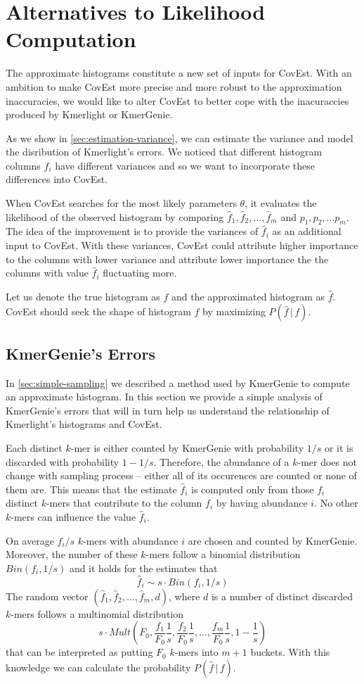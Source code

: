 \section{Alternatives to Likelihood Computation}
The approximate histograms constitute a new set of inputs for CovEst.
With an ambition to make CovEst more precise and more robust to the approximation inaccuracies,
we would like to alter CovEst to better cope with the inacuraccies produced by
Kmerlight or KmerGenie.

As we show in \ref{sec:estimation-variance}, we can estimate the variance and 
model the disribution of Kmerlight's errors. We noticed that different histogram columns $f_i$
have different variances and so we want to incorporate these differences into CovEst.

When CovEst searches for the most likely parameters $\theta$, it evaluates the likelihood
of the observed histogram by comparing $\hat f_1, \hat f_2, \dots, \hat f_m$ and 
$p_1, p_2, \dots p_m$. The idea of the improvement is to provide the variances of 
$\hat f_i$ as an additional input to CovEst. With these variances, CovEst could
attribute higher importance to the columns with lower variance and attribute
lower importance the the columns with value $\hat f_i$ fluctuating more.

Let us denote the true histogram as $f$ and the approximated histogram as $\hat f$.
CovEst should seek the shape of histogram $f$ by maximizing $P(\hat f \,|\, f)$. 

\subsection{KmerGenie's Errors}
\label{sec:kmergenie-errors}
In \ref{sec:simple-sampling} we described a method used by KmerGenie to compute 
an approximate histogram. In this section we provide a simple analysis of KmerGenie's
errors that will in turn help us understand the relationship of Kmerlight's histograms
and CovEst.

Each distinct $k$-mer is either counted by KmerGenie with probability $1/s$ or it is discarded 
with probability $1 - 1/s$. Therefore, the abundance of a $k$-mer does not change 
with sampling process -- either all of its occurences are counted or none of them are.
This means that the estimate $\hat f_i$ is computed only from those $f_i$ distinct $k$-mers 
that contribute to the column $f_i$ by having abundance $i$. No other $k$-mers can
influence the value $\hat f_i$.

On average $f_i / s$ $k$-mers with abundance $i$ are chosen and counted by KmerGenie.
Moreover, the number of these $k$-mers follow a binomial distribution $Bin(f_i, 1/s)$
and it holds for the estimates that
$$\hat f_i \sim s \cdot Bin(f_i, 1/s)$$
The random vector $(\hat f_1, \hat f_2, \dots, \hat f_m, d)$, where $d$ is a number
of distinct discarded $k$-mers follows a multinomial distribution 
$$s \cdot Mult\left(F_0, \frac{f_1}{F_0} \frac{1}{s}, \frac{f_2}{F_0} \frac{1}{s}, \dots, 
\frac{f_m}{F_0} \frac{1}{s}, 1-\frac{1}{s}\right)$$
that can be interpreted as putting $F_0$ $k$-mers into $m+1$ buckets. With this knowledge we can
calculate the probability $P(\hat f\,|\,f)$.

